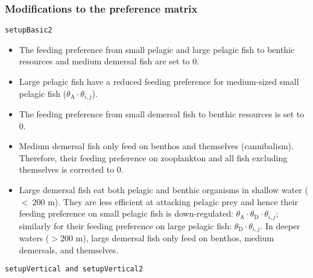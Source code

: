 \documentclass[
]{article}
\begin{document}
\hypertarget{modifications-to-the-preference-matrix}{%
\subsubsection{Modifications to the preference
matrix}\label{modifications-to-the-preference-matrix}}

\texttt{setupBasic2}

\begin{itemize}
\item
  The feeding preference from small pelagic and large pelagic fish to
  benthic resources and medium demersal fish are set to 0.
\item
  Large pelagic fish have a reduced feeding preference for medium-sized
  small pelagic fish (\(\theta_{\mathrm{A}} \cdot \theta_{i,j}\)).
\item
  The feeding preference from small demersal fish to benthic resources
  is set to 0.
\item
  Medium demersal fish only feed on benthos and themselves
  (cannibalism). Therefore, their feeding preference on zooplankton and
  all fish excluding themselves is corrected to 0.
\item
  Large demersal fish eat both pelagic and benthic organisms in shallow
  water (\(<~200\) m). They are less efficient at attacking pelagic prey
  and hence their feeding preference on small pelagic fish is
  down-regulated:
  \(\theta_{\mathrm{A}} \cdot \theta_{\mathrm{D}} \cdot \theta_{i,j}\);
  similarly for their feeding preference on large pelagic fish:
  \(\theta_{\mathrm{D}} \cdot \theta_{i,j}\). In deeper waters (\(>200\)
  m), large demersal fish only feed on benthos, medium demersals, and
  themselves.
\end{itemize}

\texttt{setupVertical\ and\ setupVertical2}
\end{document}
